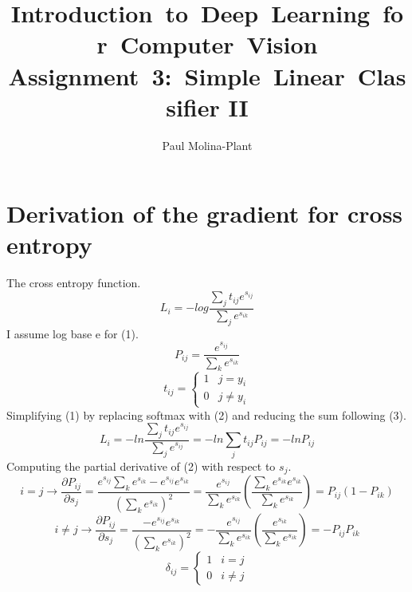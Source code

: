 \documentclass[12pt, letter]{article}
\newcommand{\courseName}{Introduction~to~Deep~Learning~for~Computer~Vision}
\newcommand{\assignName}{Assignment~3:~Simple~Linear~Classifier II}
\begin{document}
\pagestyle{titlesec_assignment}

\title{\courseName\\\assignName}
\author{Paul Molina-Plant}
\maketitle


\pagebreak

\section{Derivation of the gradient for cross entropy}
The cross entropy function.
\begin{equation}
  L_{i} = - log \frac{\sum_{j}t_{ij}e^{s_{ij}}}{\sum_{j}e^{s_{ik}}}
\end{equation}
I assume log base e for (1).
\begin{equation}
  P_{ij} = \frac{e^{s_{ij}}}{\sum_{k}e^{s_{ik}}}
\end{equation}
\begin{equation}
  t_{ij} =
  \begin{cases}
    1 & j = y_{i} \\
    0 & j \ne y_{i}
  \end{cases}
\end{equation}
Simplifying (1) by replacing softmax with (2) and reducing the sum following (3).
\begin{equation}
  L_{i} = - ln \frac{\sum_{j}t_{ij}e^{s_{ij}}}{\sum_{j}e^{s_{ij}}} = - ln \sum_{j}t_{ij}P_{ij} = - ln P_{ij}
\end{equation}
Computing the partial derivative of (2) with respect to $s_{j}$.
\begin{equation}
  i = j \longrightarrow \frac{\partial P_{ij}}{\partial s_{j}} =
  \frac{e^{s_{ij}} \sum_{k}e^{s_{ik}} - e^{s_{ij}}e^{s_{ik}}}{(\sum_{k}e^{s_{ik}})^2} =
  \frac{e^{s_{ij}}}{\sum_ke^{s_{ik}}} \left(\frac{\sum_ke^{s_{ik}}e^{s_{ik}}}{\sum_ke^{s_{ik}}}\right) =
  P_{ij} (1  - P_{ik})
\end{equation}
\begin{equation}
  i \ne j \longrightarrow \frac{\partial P_{ij}}{\partial s_{j}} = \frac{- e^{s_{ij}}e^{s_{ik}}}{(\sum_{k}e^{s_{ik}})^2} = - \frac{e^{s_{ij}}}{\sum_ke^{s_{ik}}} \left(\frac{e^{s_{ik}}}{\sum_ke^{s_{ik}}}\right) = - P_{ij}P_{ik}
\end{equation}
\begin{equation}
  \delta_{ij} =
  \begin{cases}
    1 & i = j \\
    0 & i \ne j
  \end{cases}
\end{equation}
\end{document}
